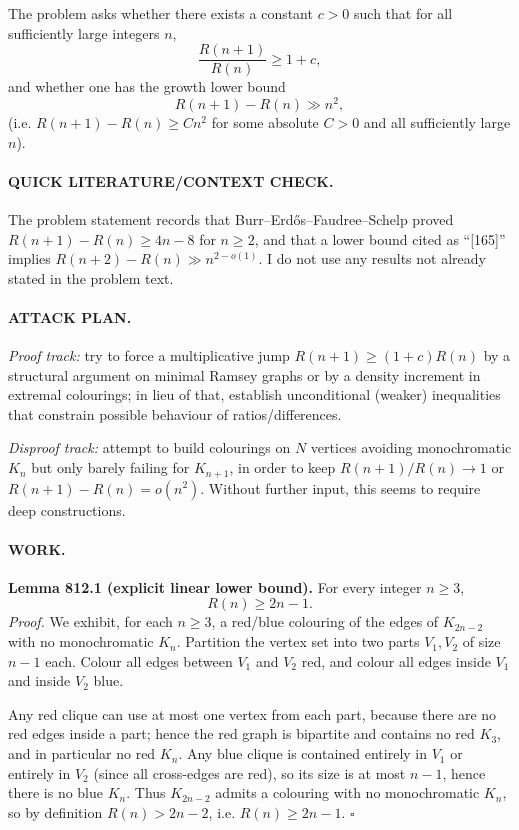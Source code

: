 The problem asks whether there exists a constant $c>0$ such that for all sufficiently large integers $n$,
\[
\frac{R(n+1)}{R(n)} \ge 1+c,
\]
and whether one has the growth lower bound
\[
R(n+1)-R(n) \gg n^2,
\]
(i.e. $R(n+1)-R(n) \ge C n^2$ for some absolute $C>0$ and all sufficiently large $n$).

\paragraph{QUICK LITERATURE/CONTEXT CHECK.}
The problem statement records that Burr--Erd\H{o}s--Faudree--Schelp proved $R(n+1)-R(n)\ge 4n-8$ for $n\ge2$, and that a lower bound cited as ``[165]'' implies $R(n+2)-R(n)\gg n^{2-o(1)}$. I do not use any results not already stated in the problem text.

\paragraph{ATTACK PLAN.}
\emph{Proof track:} try to force a multiplicative jump $R(n+1)\ge (1+c)R(n)$ by a structural argument on minimal Ramsey graphs or by a density increment in extremal colourings; in lieu of that, establish unconditional (weaker) inequalities that constrain possible behaviour of ratios/differences.

\emph{Disproof track:} attempt to build colourings on $N$ vertices avoiding monochromatic $K_n$ but only barely failing for $K_{n+1}$, in order to keep $R(n+1)/R(n)\to 1$ or $R(n+1)-R(n)=o(n^2)$. Without further input, this seems to require deep constructions.

\paragraph{WORK.}
\textbf{Lemma 812.1 (explicit linear lower bound).}
For every integer $n\ge 3$,
\[
R(n) \ge 2n-1.
\]
\emph{Proof.}
We exhibit, for each $n\ge3$, a red/blue colouring of the edges of $K_{2n-2}$ with no monochromatic $K_n$.
Partition the vertex set into two parts $V_1,V_2$ of size $n-1$ each.
Colour all edges between $V_1$ and $V_2$ red, and colour all edges inside $V_1$ and inside $V_2$ blue.

Any red clique can use at most one vertex from each part, because there are no red edges inside a part; hence the red graph is bipartite and contains no red $K_3$, and in particular no red $K_n$.
Any blue clique is contained entirely in $V_1$ or entirely in $V_2$ (since all cross-edges are red), so its size is at most $n-1$, hence there is no blue $K_n$.
Thus $K_{2n-2}$ admits a colouring with no monochromatic $K_n$, so by definition $R(n)>2n-2$, i.e. $R(n)\ge 2n-1$.
\hfill $\square$

